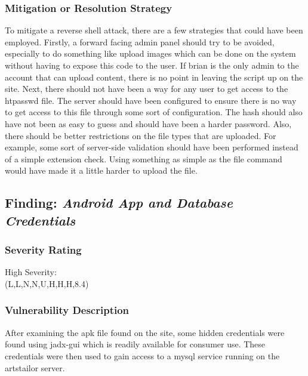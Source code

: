 \documentclass[notitlepage]{article}
\begin{document}
    \subsubsection*{Mitigation or Resolution Strategy}
    To mitigate a reverse shell attack, there are a few strategies that could have been employed. Firstly, a forward facing admin panel should try to be avoided, especially to do
    something like upload images which can be done on the system without having to expose this code to the user. If brian is the only admin to the account that can upload content, there
    is no point in leaving the script up on the site. Next, there should not have been a way for any user to get access to the htpasswd file. The server should have been configured to ensure
    there is no way to get access to this file through some sort of configuration. The hash should also have not been as easy to guess and should have been a harder password. Also, there
    should be better restrictions on the file types that are uploaded. For example, some sort of server-side validation should have been performed instead of a simple extension check. Using 
    something as simple as the file command would have made it a little harder to upload the file. 





  \subsection{Finding: \emph{Android App and Database Credentials}}
  
	\subsubsection*{Severity Rating}
        High Severity: \\	   	
		\cvss(L,L,N,N,U,H,H,H,8.4)
		
  	\subsubsection*{Vulnerability Description}
  		After examining the apk file found on the site, some hidden credentials were found using jadx-gui
        which is readily available for consumer use. These credentials were then used to gain access to a mysql
        service running on the artstailor server.
\end{document}
